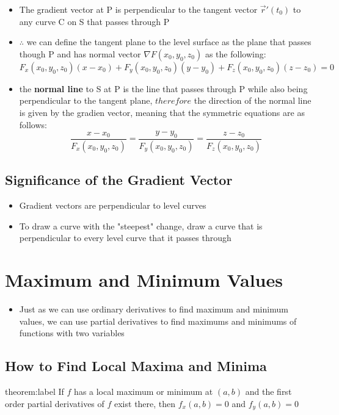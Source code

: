 \documentclass{package/notes}
\begin{document}
\begin{itemize}
	\item The gradient vector at P is perpendicular to the tangent vector $\vec r'(t_0)$ to any curve C on S that passes through P
	\item $\therefore$ we can define the tangent plane to the level surface as the plane that passes though P and has normal vector $\nabla F(x_0,y_0,z_0)$ as the following:
	$$F_x(x_0,y_0,z_0)(x-x_0) + F_y(x_0,y_0,z_0)(y-y_0)+F_z(x_0,y_0,z_0)(z-z_0)=0$$
	\item the \textbf{normal line} to S at P is the line that passes through P while also being perpendicular to the tangent plane, $therefore$ the direction of the normal line is given by the gradien vector, meaning that the symmetric equations are as follows:
	$$\frac{x-x_0}{F_x(x_0,y_0,z_0)} = \frac{y-y_0}{F_y(x_0,y_0,z_0)}=\frac{z-z_0}{F_z(x_0,y_0,z_0)}$$
\end{itemize}


\subsection{Significance of the Gradient Vector}

\begin{itemize}
	\item Gradient vectors are perpendicular to level curves
	\item To draw a curve with the "steepest" change, draw a curve that is perpendicular to every level curve that it passes through
\end{itemize}



\section{Maximum and Minimum Values}

\begin{itemize}
	\item Just as we can use ordinary derivatives to find maximum and minimum values, we can use partial derivatives to find maximums and minimums of functions with two variables
\end{itemize}


\subsection{How to Find Local Maxima and Minima}

\begin{theorem}{theorem:label}
	If $f$ has a local maximum or minimum at $(a,b)$ and the first order partial derivatives of $f$ exist there, then $f_x(a,b) = 0$ and $f_y(a,b) = 0$ 
\end{theorem}
\end{document}
